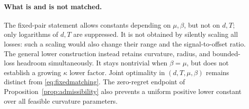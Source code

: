 \documentclass[11pt]{article}
\numberwithin{equation}{section}
\theoremstyle{definition}
\theoremstyle{remark}
\begin{document}
\paragraph{What is and is not matched.}
The fixed-pair statement allows constants depending on $\mu,\beta$, but not
on $d,T$; only logarithms of $d,T$ are suppressed. It is not obtained by
silently scaling all losses: such a scaling would also change their range and
the signal-to-offset ratio. The general lower construction instead retains
curvature, radius, and bounded-loss headroom simultaneously. It stays
nontrivial when $\beta=\mu$, but does not establish a growing $\kappa$ lower
factor. Joint optimality in $(d,T,\mu,\beta)$ remains distinct from
\eqref{eq:fixedmatching}. The zero-regret endpoint of
Proposition~\ref{prop:admissibility} also prevents a uniform positive lower
constant over all feasible curvature parameters.
\end{document}
